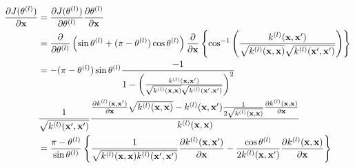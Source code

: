 \documentclass[11pt,a4j]{article}
\begin{document}
    \begin{align}
      \frac{\partial J(\theta^{(l)})}{\partial {\bf x}} 
      &= \frac{\partial J(\theta^{(l)})}{\partial \theta^{(l)}} \frac{\partial \theta^{(l)}}{\partial {\bf x}} \\
      &= \frac{\partial}{\partial \theta^{(l)}} \left( \sin \theta^{(l)} + (\pi - \theta^{(l)}) \cos \theta^{(l)} \right) \frac{\partial}{\partial {\bf x}} \left\{ \cos^{-1} \left( \frac{k^{(l)}( {\bf x}, {\bf x}' )}{ \sqrt{ k^{(l)}({\bf x}, {\bf x}) } \sqrt{ k^{(l)}({\bf x}', {\bf x}') } } \right) \right\} \\
      &= - (\pi - \theta^{(l)}) \sin \theta^{(l)} \frac{-1}{1 - {\left( \frac{k^{(l)}( {\bf x}, {\bf x}' )}{ \sqrt{ k^{(l)}({\bf x}, {\bf x}) } \sqrt{ k^{(l)}({\bf x}', {\bf x}') } } \right)}^2 } \\
      &\frac{1}{\sqrt{ k^{(l)}({\bf x}', {\bf x}') }} \frac{ \frac{\partial k^{(l)}({\bf x},{\bf x}')}{\partial {\bf x}} \sqrt{k^{(l)}({\bf x},{\bf x})} - k^{(l)}({\bf x},{\bf x}') \frac{1}{2 \sqrt{k^{(l)}({\bf x},{\bf x})}} \frac{\partial k^{(l)}({\bf x},{\bf x})}{\partial {\bf x}}  }{ k^{(l)}({\bf x}, {\bf x}) } \\
      &= \frac{ \pi - \theta^{(l)}}{ \sin \theta^{(l)}} \left\{ \frac{1}{\sqrt{k^{(l)}({\bf x}, {\bf x}) k^{(l)}({\bf x}', {\bf x}') }} \frac{\partial k^{(l)}({\bf x}, {\bf x}')}{\partial {\bf x}} - \frac{\cos \theta^{(l)}}{2 k^{(l)}({\bf x}, {\bf x}')} \frac{\partial k^{(l)}({\bf x}, {\bf x})}{\partial {\bf x}} \right\} 
    \end{align}
  
\end{document}
